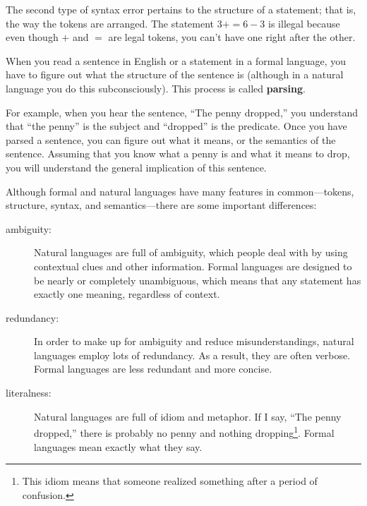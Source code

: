 
The second type of syntax error pertains to the structure of a
statement; that is, the way the tokens are arranged.  The statement $3
+ = 6 - 3$ is illegal because even though $+$ and $=$ are
legal tokens, you can't have one right after the other.

When you read a sentence in English or a statement in a formal
language, you have to figure out what the structure of the sentence is
(although in a natural language you do this subconsciously).  This
process is called {\bf parsing}.


For example, when you hear the sentence, ``The penny dropped,'' you
understand that ``the penny'' is the subject and ``dropped'' is the
predicate.  Once you have parsed a sentence, you can figure out what it
means, or the semantics of the sentence.  Assuming that you know
what a penny is and what it means to drop, you will understand the
general implication of this sentence.

Although formal and natural languages have many features in
common---tokens, structure, syntax, and semantics---there are some
important differences:


\begin{description}
	
	\item[ambiguity:] Natural languages are full of ambiguity, which
	people deal with by using contextual clues and other information.
	Formal languages are designed to be nearly or completely unambiguous,
	which means that any statement has exactly one meaning,
	regardless of context.
	
	\item[redundancy:] In order to make up for ambiguity and reduce
	misunderstandings, natural languages employ lots of
	redundancy.  As a result, they are often verbose.  Formal languages
	are less redundant and more concise.
	
	\item[literalness:] Natural languages are full of idiom and metaphor.
	If I say, ``The penny dropped,'' there is probably no penny and
	nothing dropping\footnote{This idiom means that someone realized something
		after a period of confusion.}.  Formal languages
	mean exactly what they say.
	
\end{description}

